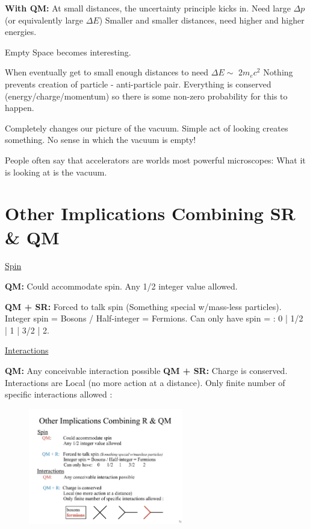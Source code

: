 {\textbf{With QM:}
At small distances, the uncertainty principle kicks in.
Need large $\Delta p$ (or equivalently large $\Delta E$)
Smaller and smaller distances, need higher and higher energies.

Empty Space becomes interesting.

When eventually get to small enough distances to need $\Delta E \sim$  2$m_e c^2$
Nothing prevents creation of particle - anti-particle pair.
Everything is conserved (energy/charge/momentum) so there is some non-zero probability for this to happen.

Completely changes our picture of the vacuum.
Simple act of looking creates something.
No sense in which the vacuum is empty!

People often say that accelerators are worlds most powerful microscopes:
What it is looking at is the vacuum.

\section{Other Implications Combining SR \& QM}

\underline{Spin}

\textbf{QM:}
Could accommodate spin. 
Any 1/2 integer value allowed.

\textbf{ QM + SR:}
Forced to talk spin (Something special w/mass-less particles).
Integer spin = Bosons / Half-integer = Fermions.
Can only have spin = : 0 | 1/2 | 1 | 3/2 | 2.

\underline{Interactions}

\textbf{QM:} Any conceivable interaction possible
\textbf{QM + SR:} Charge is conserved. 
Interactions are Local (no more action at a distance).
Only finite number of specific interactions allowed :
\begin{figure}[h]
\centering
\includegraphics[width=0.6\textwidth]{./AllowedInteractions.pdf}
\end{figure}

}
